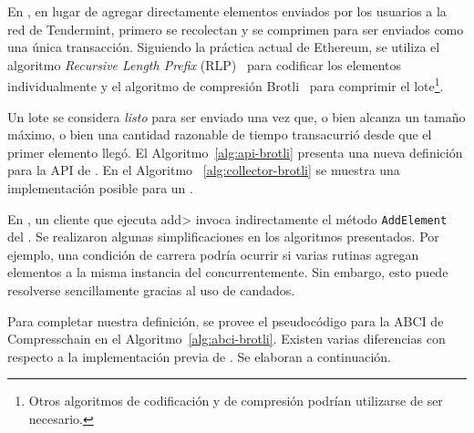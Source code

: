 %

En \compresschain, en lugar de agregar directamente elementos enviados por los usuarios a la red de Tendermint,
primero se recolectan y se comprimen para ser enviados como una única transacción.
Siguiendo la práctica actual de Ethereum, se utiliza el algoritmo
\textit{Recursive Length Prefix} (RLP)~\cite{ethereum} para codificar los elementos individualmente
y el algoritmo de compresión Brotli~\cite{brotli.compressor} para comprimir el lote\footnote{Otros
algoritmos de codificación y de compresión podrían utilizarse de ser necesario.}.

%
Un lote se considera \textit{listo} para ser enviado una vez que, o bien alcanza un tamaño máximo,
o bien una cantidad razonable de tiempo transacurrió desde que el primer elemento llegó. 
%
El Algoritmo~\ref{alg:api-brotli} presenta una nueva definición para la API de \setchain.
En el Algoritmo ~\ref{alg:collector-brotli} se muestra una implementación posible para un
\collector.





%
En \compresschain, un cliente que ejecuta \<add> invoca indirectamente el método \texttt{AddElement}
del \collector.
%
Se realizaron algunas simplificaciones en los algoritmos presentados. Por ejemplo, una condición de carrera
podría ocurrir si varias rutinas agregan elementos a la misma instancia del \collector concurrentemente.
Sin embargo, esto puede resolverse sencillamente gracias al uso de candados.



%
Para completar nuestra definición, se provee el pseudocódigo para la ABCI de Compresschain en el
Algoritmo~\ref{alg:abci-brotli}.
%
Existen varias diferencias con respecto a la implementación previa de \setchain. Se elaboran
a continuación.
%



